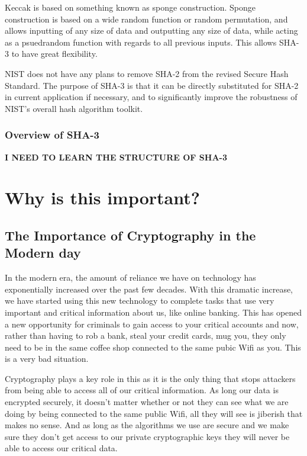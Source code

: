 Keccak is based on something known as sponge construction. Sponge construction is based on a wide random function or random permutation, and allows inputting of any size of data and outputting any size of data, while acting as a psuedrandom function with regards to all previous inputs. This allows SHA-3 to have great flexibility.

NIST does not have any plans to remove SHA-2 from the revised Secure Hash Standard. The purpose of SHA-3 is that it can be directly substituted for SHA-2 in current application if necessary, and to significantly improve the robustness of NIST's overall hash algorithm toolkit.

\subsubsection{Overview of SHA-3}

\textbf{I NEED TO LEARN THE STRUCTURE OF SHA-3}


\section{Why is this important?}

\subsection{The Importance of Cryptography in the Modern day}

In the modern era, the amount of reliance we have on technology has exponentially increased over the past few decades. With this dramatic increase, we have started using this new technology to complete tasks that use very important and critical information about us, like online banking. This has opened a new opportunity for criminals to gain access to your critical accounts and now, rather than having to rob a bank, steal your credit cards, mug you, they only need to be in the same coffee shop connected to the same pubic Wifi as you. This is a very bad situation.

Cryptography plays a key role in this as it is the only thing that stops attackers from being able to access all of our critical information. As long our data is encrypted securely, it doesn't matter whether or not they can see what we are doing by being connected to the same public Wifi, all they will see is jiberish that makes no sense. And as long as the algorithms we use are secure and we make sure they don't get access to our private cryptographic keys they will never be able to access our critical data.


